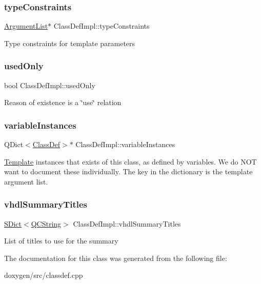 \subsubsection{\texorpdfstring{typeConstraints}{typeConstraints}}
{\footnotesize\ttfamily \mbox{\hyperlink{class_argument_list}{Argument\+List}}$\ast$ Class\+Def\+Impl\+::type\+Constraints}

Type constraints for template parameters \mbox{\label{class_class_def_impl_aef5aa0ec452605576f9a976067326e52}} 
\subsubsection{\texorpdfstring{usedOnly}{usedOnly}}
{\footnotesize\ttfamily bool Class\+Def\+Impl\+::used\+Only}

Reason of existence is a \char`\"{}use\char`\"{} relation \mbox{\label{class_class_def_impl_ac515e81dfa0ea2fe1e7aabe14d65d488}} 
\subsubsection{\texorpdfstring{variableInstances}{variableInstances}}
{\footnotesize\ttfamily Q\+Dict$<$\mbox{\hyperlink{class_class_def}{Class\+Def}}$>$$\ast$ Class\+Def\+Impl\+::variable\+Instances}

\mbox{\hyperlink{class_template}{Template}} instances that exists of this class, as defined by variables. We do N\+OT want to document these individually. The key in the dictionary is the template argument list. \mbox{\label{class_class_def_impl_a1ab8fae1f7661cf9461678debaf0c5f7}} 
\subsubsection{\texorpdfstring{vhdlSummaryTitles}{vhdlSummaryTitles}}
{\footnotesize\ttfamily \mbox{\hyperlink{class_s_dict}{S\+Dict}}$<$\mbox{\hyperlink{class_q_c_string}{Q\+C\+String}}$>$ Class\+Def\+Impl\+::vhdl\+Summary\+Titles}

List of titles to use for the summary 

The documentation for this class was generated from the following file\+:\begin{DoxyCompactItemize}
\item 
doxygen/src/classdef.\+cpp\end{DoxyCompactItemize}
